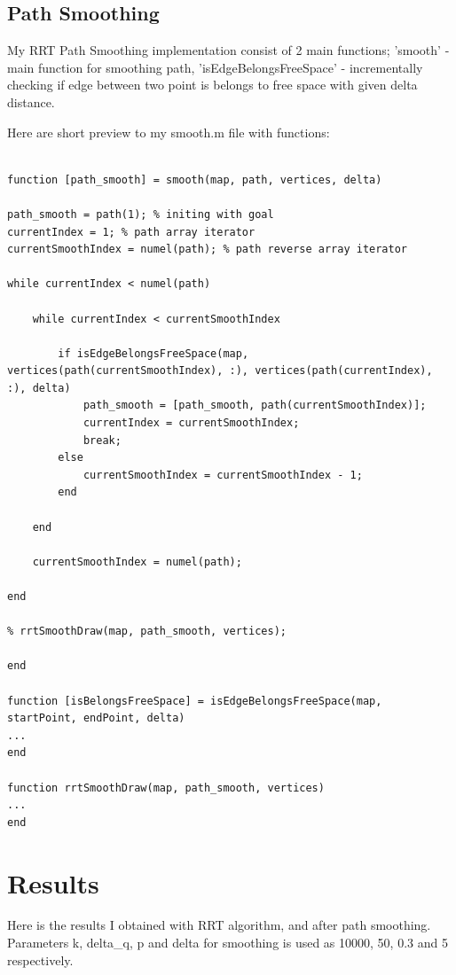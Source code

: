 \documentclass{article}
\begin{document}
		\subsection{Path Smoothing}
				My RRT Path Smoothing implementation consist of 2 main functions; 'smooth' - main function for smoothing path, 'isEdgeBelongsFreeSpace' - incrementally checking if edge between two point is belongs to free space with given delta distance.\par
		
		Here are short preview to my smooth.m file with functions:
		
	\begin{lstlisting}[label=smooth-m, caption=smooth.m]
	
function [path_smooth] = smooth(map, path, vertices, delta)

path_smooth = path(1); % initing with goal
currentIndex = 1; % path array iterator
currentSmoothIndex = numel(path); % path reverse array iterator

while currentIndex < numel(path)
    
    while currentIndex < currentSmoothIndex
        
        if isEdgeBelongsFreeSpace(map, vertices(path(currentSmoothIndex), :), vertices(path(currentIndex), :), delta)
            path_smooth = [path_smooth, path(currentSmoothIndex)];
            currentIndex = currentSmoothIndex;
            break;
        else
            currentSmoothIndex = currentSmoothIndex - 1;
        end
        
    end
    
    currentSmoothIndex = numel(path);
    
end

% rrtSmoothDraw(map, path_smooth, vertices);

end

function [isBelongsFreeSpace] = isEdgeBelongsFreeSpace(map, startPoint, endPoint, delta)
...
end

function rrtSmoothDraw(map, path_smooth, vertices)
...
end

	\end{lstlisting}

\section{Results}
	Here is the results I obtained with RRT algorithm, and after path smoothing. Parameters k, delta\_q, p and delta for smoothing is used as 10000, 50, 0.3 and 5 respectively.
\end{document}
